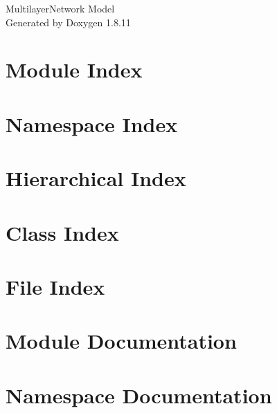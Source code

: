 \documentclass[twoside]{book}
\newcommand{\+}{\discretionary{\mbox{\scriptsize$\hookleftarrow$}}{}{}}
\newcommand{\clearemptydoublepage}{%
  \newpage{\pagestyle{empty}\cleardoublepage}%
}
\begin{document}
\hypersetup{pageanchor=false,
             bookmarksnumbered=true,
             pdfencoding=unicode
            }
\begin{titlepage}
\vspace*{7cm}
\begin{center}%
{\Large Multilayer\+Network Model }\\
\vspace*{1cm}
{\large Generated by Doxygen 1.8.11}\\
\end{center}
\end{titlepage}
\clearemptydoublepage
\tableofcontents
\clearemptydoublepage
{}
\hypersetup{pageanchor=true}

\chapter{Module Index}

\chapter{Namespace Index}

\chapter{Hierarchical Index}

\chapter{Class Index}

\chapter{File Index}

\chapter{Module Documentation}


\chapter{Namespace Documentation}

\end{document}
